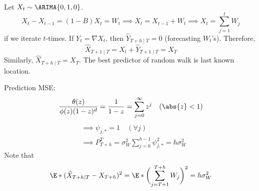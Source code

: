 \begin{Example}{}{}
    Let $ X_t \sim \ARIMA{0,1,0} $.
    \[ X_t-X_{t-1}=(1-B)X_t=W_t\implies X_t=X_{t-1}+W_t\implies X_t=\sum_{j=1}^{t} W_j \]
    if we iterate $ t $-times. If $ Y_t = \nabla X_t $, then $ \hat{Y}_{T+h\mid T}=0 $
    (forecasting $ W_t $'s). Therefore,
    \[ \hat{X}_{T+1\mid T}=X_t+\hat{Y}_{T+1\mid T}=X_T \]
    Similarly, $ \hat{X}_{T+h\mid T}=X_T $. The best predictor of random walk is last known location.

    Prediction MSE\@: \[ \frac{\theta(z)}{\phi(z)(1-z)^d}=\frac{1}{1-z} =\sum_{j=0}^{\infty} z^j\quad(\abs{z}<1)  \]
    \begin{align*}
         & \implies\psi_{j,*}=1\quad(\forall j)                                    \\
         & \implies P_{T+h}^T=\sigma_W^2 \sum_{j=0}^{h-1} \psi_{j,*}^2=h\sigma_W^2
    \end{align*}
    Note that
    \[ \E*{(\hat{X}_{T+h\mid T}-X_{T+h})^2}=\E*{\biggl(\sum_{j=T+1}^{T+h} W_j\biggr)^2}=h\sigma_W^2 \]
    \begin{center}
        \begin{tikzpicture}[x=0.75pt,y=0.75pt,yscale=-1,xscale=1]


\end{tikzpicture}
\end{center}
\end{Example}
